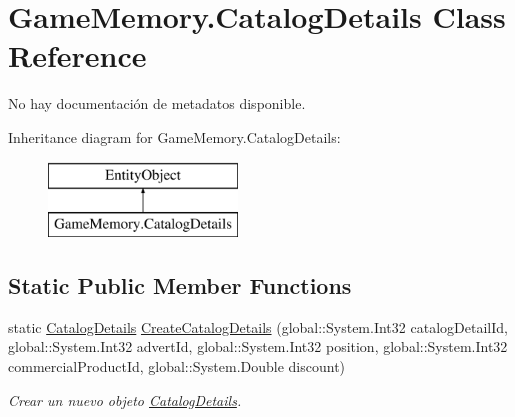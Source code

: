\hypertarget{class_game_memory_1_1_catalog_details}{\section{Game\-Memory.\-Catalog\-Details Class Reference}
\label{class_game_memory_1_1_catalog_details}
}


No hay documentación de metadatos disponible.  


Inheritance diagram for Game\-Memory.\-Catalog\-Details\-:\begin{figure}[H]
\begin{center}
\leavevmode
\includegraphics[height=2.000000cm]{class_game_memory_1_1_catalog_details}
\end{center}
\end{figure}
\subsection*{Static Public Member Functions}
\begin{DoxyCompactItemize}
\item 
static \hyperlink{class_game_memory_1_1_catalog_details}{Catalog\-Details} \hyperlink{class_game_memory_1_1_catalog_details_a4981cf637877d8c711145ae9d88e68af}{Create\-Catalog\-Details} (global\-::\-System.\-Int32 catalog\-Detail\-Id, global\-::\-System.\-Int32 advert\-Id, global\-::\-System.\-Int32 position, global\-::\-System.\-Int32 commercial\-Product\-Id, global\-::\-System.\-Double discount)
\begin{DoxyCompactList}\small\item\em Crear un nuevo objeto \hyperlink{class_game_memory_1_1_catalog_details}{Catalog\-Details}. \end{DoxyCompactList}\end{DoxyCompactItemize}
